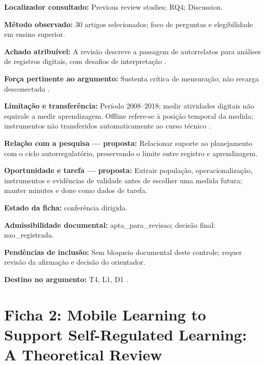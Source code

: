 \noindent\textbf{Localizador consultado:} Previous review studies; RQ4; Discussion.\par\medskip

\noindent\textbf{Método observado:} 30 artigos selecionados; foco de perguntas e elegibilidade em ensino superior.\par\medskip

\noindent\textbf{Achado atribuível:} A revisão descreve a passagem de autorrelatos para análises de registros digitais, com desafios de interpretação \citep[p. 4, 15–16]{education_araka2020}.\par\medskip

\noindent\textbf{Força pertinente ao argumento:} Sustenta crítica de mensuração; não recarga desconectada \citep[p. 4, 15–16]{education_araka2020}.\par\medskip

\noindent\textbf{Limitação e transferência:} Período 2008–2018; medir atividades digitais não equivale a medir aprendizagem. Offline refere-se à posição temporal da medida; instrumentos não transferidos automaticamente ao curso técnico \citep[p. 4, 15–16]{education_araka2020}.\par\medskip

\noindent\textbf{Relação com a pesquisa — proposta:} Relacionar suporte ao planejamento com o ciclo autorregulatório, preservando o limite entre registro e aprendizagem.\par\medskip

\noindent\textbf{Oportunidade e tarefa — proposta:} Extrair população, operacionalização, instrumentos e evidências de validade antes de escolher uma medida futura; manter minutes e done como dados de tarefa.\par\medskip

\noindent\textbf{Estado da ficha:} conferência dirigida.\par\medskip

\noindent\textbf{Admissibilidade documental:} apta\_para\_revisao; decisão final: nao\_registrada.\par\medskip

\noindent\textbf{Pendências de inclusão:} Sem bloqueio documental deste controle; requer revisão da afirmação e decisão do orientador.\par\medskip

\noindent\textbf{Destino no argumento:} T4, L1, D1 .

\clearpage\section*{Ficha 2: Mobile Learning to Support Self-Regulated Learning: A Theoretical Review}

